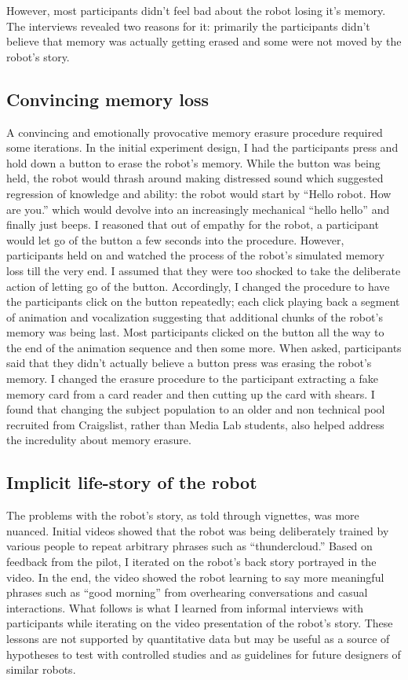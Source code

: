 However, most participants didn't feel bad about the robot losing it's memory. The interviews revealed two reasons for it: primarily the participants didn't believe that memory was actually getting erased and some were not moved by the robot's story. 

\subsection{Convincing memory loss}

A convincing and emotionally provocative memory erasure procedure required some iterations. In the initial experiment design, I had the participants press and hold down a button to erase the robot's memory. While the button was being held, the robot would thrash around making distressed sound which suggested regression of knowledge and ability: the robot would start by ``Hello robot. How are you.'' which would devolve into an increasingly mechanical ``hello hello'' and finally just beeps. I reasoned that out of empathy for the robot, a participant would let go of the button a few seconds into the procedure. However, participants held on and watched the process of the robot's simulated memory loss till the very end. I assumed that they were too shocked to take the deliberate action of letting go of the button. Accordingly, I changed the procedure to have the participants click on the button repeatedly; each click playing back a segment of animation and vocalization suggesting that additional chunks of the robot's memory was being last. Most participants clicked on the button all the way to the end of the animation sequence and then some more. When asked, participants said that they didn't actually believe a button press was erasing the robot's memory. I changed the erasure procedure to the participant extracting a fake memory card from a card reader and then cutting up the card with shears. I found that changing the subject population to an older and non technical pool recruited from Craigslist, rather than Media Lab students, also helped address the incredulity about memory erasure.

\subsection{Implicit life-story of the robot}

The problems with the robot's story, as told through vignettes, was more nuanced. Initial videos showed that the robot was being deliberately trained by various people to repeat arbitrary phrases such as  ``thundercloud.'' Based on feedback from the pilot, I iterated on the robot's back story portrayed in the video. In the end, the video showed the robot learning to say more meaningful phrases such as ``good morning'' from overhearing conversations and casual interactions. What follows is what I learned from informal interviews with participants while iterating on the video presentation of the robot's story. These lessons are not supported by quantitative data but may be useful as a source of hypotheses to test with controlled studies and as guidelines for future designers of similar robots. 

